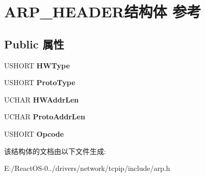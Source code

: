 \hypertarget{struct_a_r_p___h_e_a_d_e_r}{}\section{A\+R\+P\+\_\+\+H\+E\+A\+D\+E\+R结构体 参考}
\label{struct_a_r_p___h_e_a_d_e_r}
\subsection*{Public 属性}
\begin{DoxyCompactItemize}
\item 
\mbox{\label{struct_a_r_p___h_e_a_d_e_r_a1cbaf41272d8cf077a998d2b01a75bc1}} 
U\+S\+H\+O\+RT {\bfseries H\+W\+Type}
\item 
\mbox{\label{struct_a_r_p___h_e_a_d_e_r_a404719d99171ea3ecab3a4e7d4442ce6}} 
U\+S\+H\+O\+RT {\bfseries Proto\+Type}
\item 
\mbox{\label{struct_a_r_p___h_e_a_d_e_r_a8f0b8967239bf7b17d2e8a11926cff4a}} 
U\+C\+H\+AR {\bfseries H\+W\+Addr\+Len}
\item 
\mbox{\label{struct_a_r_p___h_e_a_d_e_r_a039bb5c2bfad13b0ebfcaabe0a35fba7}} 
U\+C\+H\+AR {\bfseries Proto\+Addr\+Len}
\item 
\mbox{\label{struct_a_r_p___h_e_a_d_e_r_ad956f1fc7df5a950febe062dfdf0380d}} 
U\+S\+H\+O\+RT {\bfseries Opcode}
\end{DoxyCompactItemize}


该结构体的文档由以下文件生成\+:\begin{DoxyCompactItemize}
\item 
E\+:/\+React\+O\+S-\/0../drivers/network/tcpip/include/arp.\+h\end{DoxyCompactItemize}

